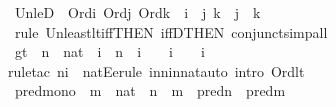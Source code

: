 \begin{isabellebody}
\endisatagproof
{\isafoldproof}%
%
\isadelimproof
\isanewline
%
\endisadelimproof
\isanewline
{}\isamarkupfalse%
\ Un{\isacharunderscore}{\kern0pt}leD{}\ {\isacharcolon}{\kern0pt}\ {\isachardoublequoteopen}Ord{\isacharparenleft}{\kern0pt}i{\isacharparenright}{\kern0pt}{\isasymLongrightarrow}\ Ord{\isacharparenleft}{\kern0pt}j{\isacharparenright}{\kern0pt}{\isasymLongrightarrow}\ Ord{\isacharparenleft}{\kern0pt}k{\isacharparenright}{\kern0pt}{\isasymLongrightarrow}\ \ i\ {\isasymunion}\ j\ {\isasymle}k\ {\isasymLongrightarrow}\ j\ {\isasymle}\ k{\isachardoublequoteclose}\ \ \ \isanewline
%
\isadelimproof
\ \ %
\endisadelimproof
%
\isatagproof
{}\isamarkupfalse%
\ {\isacharparenleft}{\kern0pt}rule\ Un{\isacharunderscore}{\kern0pt}least{\isacharunderscore}{\kern0pt}lt{\isacharunderscore}{\kern0pt}iff{\isacharbrackleft}{\kern0pt}THEN\ iffD{}{\isacharbrackleft}{\kern0pt}THEN\ conjunct{}{\isacharbrackright}{\kern0pt}{\isacharbrackright}{\kern0pt}{\isacharcomma}{\kern0pt}simp{\isacharunderscore}{\kern0pt}all{\isacharparenright}{\kern0pt}%
\endisatagproof
{\isafoldproof}%
%
\isadelimproof
\isanewline
%
\endisadelimproof
\isanewline
{}\isamarkupfalse%
\ gt{}\ {\isacharcolon}{\kern0pt}\ {\isachardoublequoteopen}n\ {\isasymin}\ nat\ {\isasymLongrightarrow}\ i\ {\isasymin}\ n\ {\isasymLongrightarrow}\ i\ {\isasymnoteq}\ {}\ {\isasymLongrightarrow}\ i\ {\isasymnoteq}\ {}\ {\isasymLongrightarrow}\ {}{\isacharless}{\kern0pt}i{\isachardoublequoteclose}\isanewline
%
\isadelimproof
\ \ %
\endisadelimproof
%
\isatagproof
{}\isamarkupfalse%
{\isacharparenleft}{\kern0pt}rule{\isacharunderscore}{\kern0pt}tac\ n{\isacharequal}{\kern0pt}{\isachardoublequoteopen}i{\isachardoublequoteclose}\ \ natE{\isacharcomma}{\kern0pt}erule\ in{\isacharunderscore}{\kern0pt}n{\isacharunderscore}{\kern0pt}in{\isacharunderscore}{\kern0pt}nat{\isacharcomma}{\kern0pt}auto\ intro{\isacharcolon}{\kern0pt}\ Ord{\isacharunderscore}{\kern0pt}{}{\isacharunderscore}{\kern0pt}lt{\isacharparenright}{\kern0pt}%
\endisatagproof
{\isafoldproof}%
%
\isadelimproof
\isanewline
%
\endisadelimproof
\isanewline
{}\isamarkupfalse%
\ pred{\isacharunderscore}{\kern0pt}mono\ {\isacharcolon}{\kern0pt}\ {\isachardoublequoteopen}m\ {\isasymin}\ nat\ {\isasymLongrightarrow}\ n\ {\isasymle}\ m\ {\isasymLongrightarrow}\ pred{\isacharparenleft}{\kern0pt}n{\isacharparenright}{\kern0pt}\ {\isasymle}\ pred{\isacharparenleft}{\kern0pt}m{\isacharparenright}{\kern0pt}{\isachardoublequoteclose}\isanewline

\end{isabellebody}
